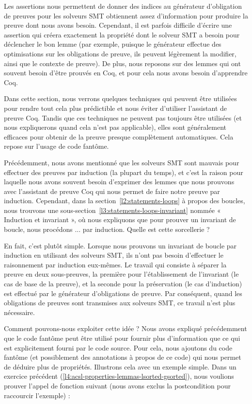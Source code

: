 Les assertions nous permettent de donner des indices au générateur
d'obligation de preuves pour les solveurs SMT obtiennent assez d'information
pour produire la preuve dont nous avons besoin. Cependant, il est parfois
difficile d'écrire une assertion qui créera exactement la propriété dont le
solveur SMT a besoin pour déclencher le bon lemme (par exemple, puisque le
générateur effectue des optimisations sur les obligations de preuve, ils peuvent
légèrement la modifier, ainsi que le contexte de preuve). De plus, nous
reposons sur des lemmes qui ont souvent besoin d'être prouvés en Coq, et pour
cela nous avons besoin d'apprendre Coq.


Dans cette section, nous verrons quelques techniques qui peuvent être
utilisées pour rendre tout cela plus prédictible et nous éviter d'utiliser
l'assistant de preuve Coq. Tandis que ces techniques ne peuvent pas toujours
être utilisées (et nous expliquerons quand cela n'est pas applicable), elles
sont généralement efficaces pour obtenir de la preuve presque complètement
automatiques. Cela repose sur l'usage de code fantôme.




Précédemment, nous avons mentionné que les solveurs SMT sont mauvais pour
effectuer des preuves par induction (la plupart du temps), et c'est la raison
pour laquelle nous avons souvent besoin d'exprimer des lemmes que nous prouvons
avec l'assistant de preuve Coq qui nous permet de faire notre preuve par
induction. Cependant, dans la section~\ref{l2:statements-loops} à propos des
boucles, nous trouvons une sous-section~\ref{l3:statements-loops-invariant}
nommée « Induction et invariant », où nous expliquons que pour prouver un
invariant de boucle, nous procédons ... par induction. Quelle est cette
sorcellerie ?


En fait, c'est plutôt simple. Lorsque nous prouvons un invariant de boucle par
induction en utilisant des solveurs SMT, ils n'ont pas besoin d'effectuer le
raisonnement par induction eux-mêmes. Le travail qui consiste à séparer la 
preuve en deux sous-preuves, la première pour l'établissement de l'invariant
(le cas de base de la preuve), et la seconde pour la préservation (le cas
d'induction) est effectué par le générateur d'obligations de preuve. 
Par conséquent, quand les obligations de preuves sont transmises aux solveurs
SMT, ce travail n'est plus nécessaire.


Comment pouvons-nous exploiter cette idée ? Nous avons expliqué précédemment
que le code fantôme peut être utilisé pour fournir plus d'information que ce qui
est explicitement fourni par le code source. Pour cela, nous ajoutons du code
fantôme (et possiblement des annotations à propos de ce code) qui nous permet
de déduire plus de propriétés. Illustrons cela avec un exemple simple. Dans 
un exercice précédent (\ref{l4:acsl-properties-lemmas-lsorted-gsorted}), nous
voulions prouver l'appel de fonction suivant (nous avons exclus la
postcondition pour raccourcir l'exemple) :


